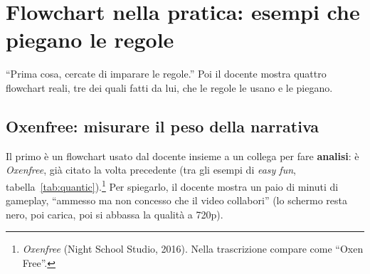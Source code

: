 \section{Flowchart nella pratica: esempi che piegano le regole}
\label{sec:flowchart-esempi}



``Prima cosa, cercate di imparare le regole.'' Poi il docente mostra quattro
flowchart reali, tre dei quali fatti da lui, che le regole le usano e le
piegano.

\subsection{Oxenfree: misurare il peso della narrativa}

Il primo è un flowchart usato dal docente insieme a un collega per fare
\textbf{analisi}: è \emph{Oxenfree}, già citato la volta precedente (tra gli
esempi di \emph{easy fun}, tabella~\ref{tab:quantic}).\footnote{\emph{Oxenfree}
(Night School Studio, 2016). Nella trascrizione compare come ``Oxen Free''.}
Per spiegarlo, il docente mostra un paio di minuti di gameplay, ``ammesso ma
non concesso che il video collabori'' (lo schermo resta nero, poi carica, poi
si abbassa la qualità a 720p).

